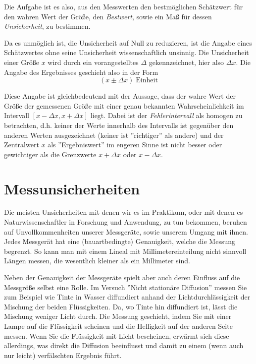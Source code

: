 Die Aufgabe ist es also, aus den Messwerten den bestmöglichen Schätzwert für den wahren Wert der Größe, den \textit{Bestwert}, sowie ein Maß für dessen \textit{Unsicherheit}, zu bestimmen. 

Da es unmöglich ist, die Unsicherheit auf Null zu reduzieren, ist die Angabe eines Schätzwertes ohne seine Unsicherheit wissenschaftlich unsinnig. Die Unsicherheit einer Größe $x$ wird durch ein vorangestelltes $\Delta$ gekennzeichnet, hier also $\Delta x$. Die Angabe des Ergebnisses geschieht also in der Form
\begin{equation}
	\left( x\pm\Delta x\right)\;\mathrm{Einheit}
\end{equation}

Diese Angabe ist gleichbedeutend mit der Aussage, dass der wahre Wert der Größe der gemessenen Größe mit einer genau bekannten Wahrscheinlichkeit im Intervall $\left[x-\Delta x, x + \Delta x\right]$ liegt. Dabei ist der \textit{Fehlerintervall} als homogen zu betrachten, d.h. keiner der Werte innerhalb des Intervalls ist gegenüber den anderen Werten ausgezeichnet (keiner ist ''richtiger'' als andere) und der Zentralwert $x$ als ''Ergebniswert'' im engeren Sinne ist nicht besser oder gewichtiger als die Grenzwerte $x+\Delta x$ oder $x-\Delta x$.

\section{Messunsicherheiten}

Die meisten Unsicherheiten mit denen wir es im Praktikum, oder mit denen es Naturwissenschaftler in Forschung und Anwendung, zu tun bekommen, beruhen auf Unvollkommenheiten unserer Messgeräte, sowie unserem Umgang mit ihnen. Jedes Messgerät hat eine (bauartbedingte) Genauigkeit, welche die Messung begrenzt. So kann man mit einem Lineal mit Millimetereinteilung nicht sinnvoll Längen messen, die wesentlich kleiner als ein Millimeter sind.

Neben der Genauigkeit der Messgeräte spielt aber auch deren Einfluss auf die Messgröße selbst eine Rolle. Im Versuch ''Nicht stationäre Diffusion'' messen Sie zum Beispiel wie Tinte in Wasser diffundiert anhand der Lichtdurchlässigkeit der Mischung der beiden Flüssigkeiten. Da, wo Tinte hin diffundiert ist, lässt die Mischung weniger Licht durch. Die Messung geschieht, indem Sie mit einer Lampe auf die Flüssigkeit scheinen und die Helligkeit auf der anderen Seite messen. Wenn Sie die Flüssigkeit mit Licht bescheinen, erwärmt sich diese allerdings, was direkt die Diffusion beeinflusst und damit zu einem (wenn auch nur leicht) verfälschten Ergebnis führt.\\



